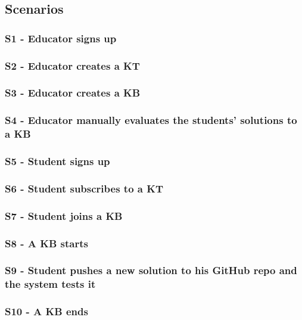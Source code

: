 \documentclass[11pt]{report}
\begin{document}
\subsection{Scenarios}
\subsubsection{S1 - Educator signs up}
\subsubsection{S2 - Educator creates a KT}
\subsubsection{S3 - Educator creates a KB}
\subsubsection{S4 - Educator manually evaluates the students' solutions to a KB}
\subsubsection{S5 - Student signs up}
\subsubsection{S6 - Student subscribes to a KT}
\subsubsection{S7 - Student joins a KB}
\subsubsection{S8 - A KB starts}
\subsubsection{S9 - Student pushes a new solution to his GitHub repo and the system tests it}
\subsubsection{S10 - A KB ends}
\end{document}
